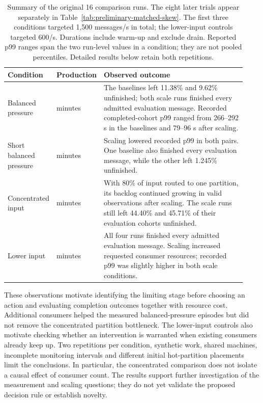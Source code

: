 \begin{table}[!htbp]
\centering\small
\setlength{\tabcolsep}{5pt}
\begin{tabular}{@{}>{\raggedright\arraybackslash}p{0.18\linewidth}>{\raggedright\arraybackslash}p{0.13\linewidth}>{\raggedright\arraybackslash}p{0.62\linewidth}@{}}
\toprule
\textbf{Condition} & \textbf{Production} & \textbf{Observed outcome}\\
\midrule
Balanced pressure & 10 minutes & The baselines left 11.38\% and 9.62\% unfinished; both scale runs finished every admitted evaluation message. Recorded completed-cohort p99 ranged from 266--292 s in the baselines and 79--96 s after scaling.\\[5pt]
Short balanced pressure & 3 minutes & Scaling lowered recorded p99 in both pairs. One baseline also finished every evaluation message, while the other left 1.245\% unfinished.\\[5pt]
Concentrated input & 5 minutes & With 80\% of input routed to one partition, its backlog continued growing in valid observations after scaling. The scale runs still left 44.40\% and 45.71\% of their evaluation cohorts unfinished.\\[5pt]
Lower input & 3 minutes & All four runs finished every admitted evaluation message. Scaling increased requested consumer resources; recorded p99 was slightly higher in both scale conditions.\\
\bottomrule
\end{tabular}
\caption{Summary of the original 16 comparison runs. The eight later trials appear separately in Table~\ref{tab:preliminary-matched-skew}. The first three conditions targeted 1,500 messages/s in total; the lower-input controls targeted 600/s. Durations include warm-up and exclude drain. Reported p99 ranges span the two run-level values in a condition; they are not pooled percentiles. Detailed results below retain both repetitions.}
\label{tab:preliminary-overview}
\end{table}

These observations motivate identifying the limiting stage before choosing an action and evaluating completion outcomes together with resource cost. Additional consumers helped the measured balanced-pressure episodes but did not remove the concentrated partition bottleneck. The lower-input controls also motivate checking whether an intervention is warranted when existing consumers already keep up. Two repetitions per condition, synthetic work, shared machines, incomplete monitoring intervals and different initial hot-partition placements limit the conclusions. In particular, the concentrated comparison does not isolate a causal effect of consumer count. The results support further investigation of the measurement and scaling questions; they do not yet validate the proposed decision rule or establish novelty.

